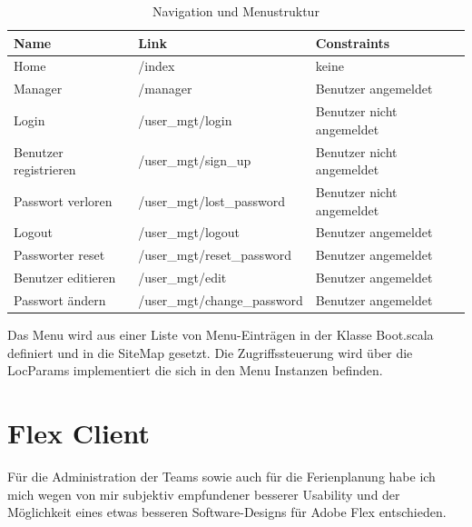 \begin{spacing}{0.5}
  \begin{longtable}{|p{2cm}|p{5cm}|p{6cm}|}
      \caption{Navigation und Menustruktur}\\
\hline
  \textbf{Name} & \textbf{Link} & \textbf{Constraints}\\
  \hline
  Home & /index & keine\\
  \hline
  Manager & /manager & Benutzer angemeldet\\
  \hline
  Login & /user\_mgt/login & Benutzer nicht angemeldet\\
  \hline
  Benutzer registrieren & /user\_mgt/sign\_up & Benutzer nicht angemeldet\\
  \hline
  Passwort verloren & /user\_mgt/lost\_password & Benutzer nicht angemeldet\\
  \hline
  Logout & /user\_mgt/logout & Benutzer angemeldet\\
  \hline
 Passworter reset & /user\_mgt/reset\_password & Benutzer angemeldet\\
  \hline
  Benutzer editieren & /user\_mgt/edit & Benutzer angemeldet\\
  \hline
  Passwort \"andern & /user\_mgt/change\_password & Benutzer angemeldet\\
  \hline
  \end{longtable}
\end{spacing}

Das Menu wird aus einer Liste von Menu-Eintr\"agen in der Klasse Boot.scala definiert und in die SiteMap gesetzt. Die Zugriffssteuerung wird \"uber die LocParams implementiert die sich in den Menu Instanzen befinden. 
 
\section{Flex Client}
F\"ur die Administration der Teams sowie auch f\"ur die Ferienplanung habe ich mich wegen von mir subjektiv empfundener besserer Usability und der M\"oglichkeit eines etwas besseren Software-Designs f\"ur Adobe Flex entschieden. 
